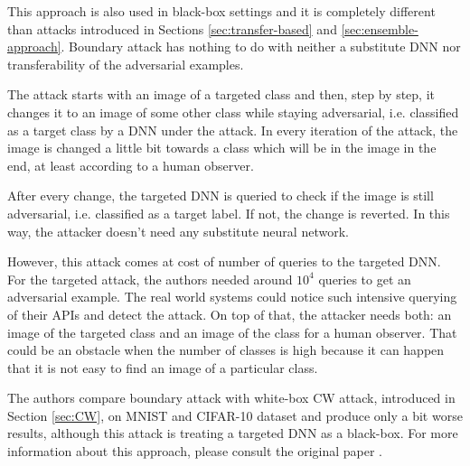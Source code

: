 This approach is also used in black-box settings and it is completely different than attacks introduced in Sections \ref{sec:transfer-based} and \ref{sec:ensemble-approach}. Boundary attack has nothing to do with neither a substitute DNN nor transferability of the adversarial examples. 

The attack starts with an image of a targeted class and then, step by step, it changes it to an image of some other class while staying adversarial, i.e. classified as a target class by a DNN under the attack. In every iteration of the attack, the image is changed a little bit towards a class which will be in the image in the end, at least according to a human observer. 

After every change, the targeted DNN is queried to check if the image is still adversarial, i.e. classified as a target label. If not, the change is reverted. In this way, the attacker doesn't need any substitute neural network. 

However, this attack comes at cost of number of queries to the targeted DNN. For the targeted attack, the authors needed around $10^4$ queries to get an adversarial example. The real world systems could notice such intensive querying of their APIs and detect the attack. On top of that, the attacker needs both: an image of the targeted class and an image of the class for a human observer. That could be an obstacle when the number of classes is high because it can happen that it is not easy to find an image of a particular class.

The authors \cite{brendel2018decisionbased} compare boundary attack with white-box CW attack, introduced in Section \ref{sec:CW}, on MNIST and CIFAR-10 dataset and produce only a bit worse results, although this attack is treating a targeted DNN as a black-box.  For more information about this approach, please consult the original paper \cite{brendel2018decisionbased}.
